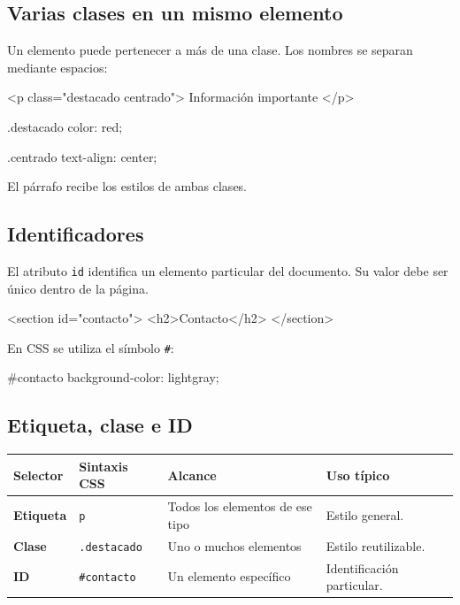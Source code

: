 \documentclass[11pt]{article}
\begin{document}
    \subsection{Varias clases en un mismo elemento}

    Un elemento puede pertenecer a más de una clase. Los nombres se separan mediante espacios:

    \begin{htmlcodedark}
        <p class="destacado centrado">
            Información importante
        </p>
    \end{htmlcodedark}

    \begin{csscodedark}
        .destacado {
            color: red;
        }

        .centrado {
            text-align: center;
        }
    \end{csscodedark}

    El párrafo recibe los estilos de ambas clases.

    \subsection{Identificadores}

    El atributo \texttt{id} identifica un elemento particular del documento. Su valor debe ser único dentro de la página.

    \begin{htmlcodedark}
        <section id="contacto">
            <h2>Contacto</h2>
        </section>
    \end{htmlcodedark}

    En CSS se utiliza el símbolo \texttt{\#}:

    \begin{csscodedark}
        #contacto {
            background-color: lightgray;
        }
    \end{csscodedark}

    \subsection{Etiqueta, clase e ID}

    \begin{center}
        \begin{tabularx}{0.95\textwidth}{>{\bfseries}p{2.0cm}p{2.5cm}p{6.0cm}X}
            \toprule
            Selector & Sintaxis CSS & Alcance & Uso típico \\
            \midrule
            Etiqueta & \texttt{p} & Todos los elementos de ese tipo & Estilo general. \\
            Clase & \texttt{.destacado} & Uno o muchos elementos & Estilo reutilizable. \\
            ID & \texttt{\#contacto} & Un elemento específico & Identificación particular. \\
            \bottomrule
        \end{tabularx}
    \end{center}
\end{document}
